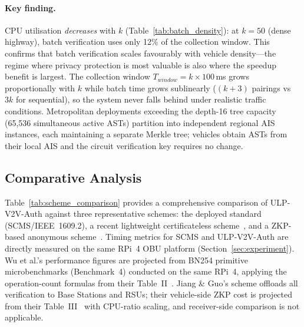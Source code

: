 \paragraph{Key finding.}
CPU utilisation \emph{decreases} with $k$ (Table~\ref{tab:batch_density}): at
$k=50$ (dense highway), batch verification uses only 12\% of the collection
window. This confirms that batch verification scales favourably with vehicle
density---the regime where privacy protection is most valuable is also where the
speedup benefit is largest. The collection window $T_{window} = k \times 100$\,ms
grows proportionally with $k$ while batch time grows sublinearly ($(k+3)$ pairings
vs $3k$ for sequential), so the system never falls behind under realistic traffic
conditions.
Metropolitan deployments exceeding the depth-16 tree capacity (65{,}536 simultaneous
active ASTs) partition into independent regional AIS instances, each maintaining a
separate Merkle tree; vehicles obtain ASTs from their local AIS and the circuit
verification key requires no change.

\subsection{Comparative Analysis}
\label{sec:comparison}

Table~\ref{tab:scheme_comparison} provides a comprehensive comparison of
ULP-V2V-Auth against three representative schemes: the deployed standard
(SCMS/IEEE~1609.2), a recent lightweight certificateless scheme~\cite{zhang2024},
and a ZKP-based anonymous scheme~\cite{jiang2024}. Timing metrics for SCMS and
ULP-V2V-Auth are directly measured on the same RPi~4 OBU platform
(Section~\ref{sec:experiment}). Wu et al.'s performance figures are projected
from BN254 primitive microbenchmarks (Benchmark~4) conducted on the same RPi~4,
applying the operation-count formulas from their Table~II~\cite{zhang2024}.
Jiang \& Guo's scheme offloads all verification to Base Stations and RSUs;
their vehicle-side ZKP cost is projected from their Table~III~\cite{jiang2024}
with CPU-ratio scaling, and receiver-side comparison is not applicable.

